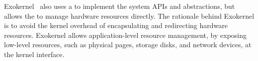 

Exokernel~\cite{engler95exokernel} also uses a \libos{}
to implement the system APIs and abstractions, but allows the \libos{} to manage hardware resources directly.
The rationale behind Exokernel is to avoid the kernel overhead of encapsulating and redirecting hardware resources.
Exokernel allows application-level resource management, by exposing low-level resources, such as physical pages, storage disks, and network devices, at the kernel interface.



















